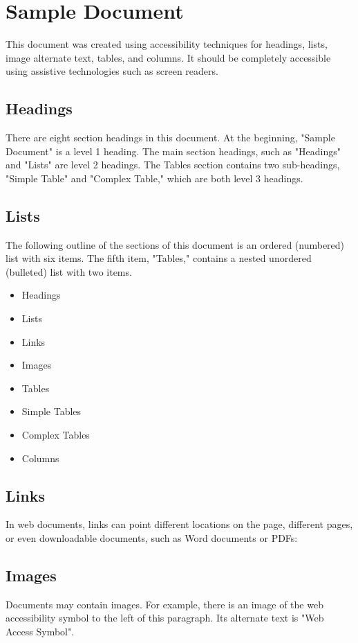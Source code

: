 \documentclass{article}
\begin{document}
\section{Sample Document}
This document was created using accessibility techniques for headings, lists, image alternate text, tables, and columns. It should be completely accessible using assistive technologies such as screen readers.

\subsection{Headings}
There are eight section headings in this document. At the beginning, "Sample Document" is a level 1 heading. The main section headings, such as "Headings" and "Lists" are level 2 headings. The Tables section contains two sub-headings, "Simple Table" and "Complex Table," which are both level 3 headings.

\subsection{Lists}
The following outline of the sections of this document is an ordered (numbered) list with six items. The fifth item, "Tables," contains a nested unordered (bulleted) list with two items.

\begin{itemize}
  \item Headings
  \item Lists
  \item Links
  \item Images
  \item Tables
  \item Simple Tables
  \item Complex Tables
  \item Columns
\end{itemize}
\subsection{Links}
In web documents, links can point different locations on the page, different pages, or even downloadable documents, such as Word documents or PDFs:

\subsection{Images}
Documents may contain images. For example, there is an image of the web accessibility symbol to the left of this paragraph. Its alternate text is "Web Access Symbol".
\end{document}
